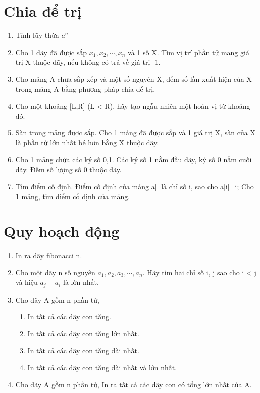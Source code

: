 \documentclass[12pt,a4paper]{article}
\begin{document}
\section{Chia để trị}
\begin{enumerate}
	\item Tính lũy thừa $a^n$
	\item Cho 1 dãy đã được sắp $x_1,x_2,\cdots,x_n$ và 1 số X. Tìm vị trí phần tử mang giá trị X thuộc dãy, nếu không có trả về giá trị -1.
	\item Cho mảng A chưa sắp xếp và một số nguyên X, đếm số lần xuất hiện của X trong mảng A bằng phương pháp chia để trị.
	
	\item Cho một khoảng [L,R] (L < R), hãy tạo ngẫu nhiên một hoán vị từ khoảng đó.
	

	\item Sàn trong mảng được sắp. Cho 1 mảng đã được sắp và 1 giá trị X, sàn của X là phần tử lớn nhất bé hơn bằng X thuộc dãy.
	\item Cho 1 mảng chứa các ký số 0,1. Các ký số 1 nằm đầu dãy, ký số 0 nằm cuối dãy. Đếm số lượng số 0 thuộc dãy.
	\item Tìm điểm cố định. Điểm cố định của mảng a[] là chỉ số i, sao cho a[i]=i; Cho 1 mảng, tìm điểm cố định của mảng.
	
\end{enumerate}

\section{Quy hoạch động}
\begin{enumerate}
	\item In ra dãy fibonacci n.
	\item Cho một dãy n số nguyên $a_1, a_2, a_3,\cdots,a_n$. Hãy tìm hai chỉ số i, j sao cho i < j và hiệu $a_j - a_i$ là lớn nhất.
	\item Cho dãy A gồm n phần tử, 
	\begin{enumerate}
		\item In tất cả các dãy con tăng.
		\item In tất cả các dãy con tăng lớn nhất.
		\item In tất cả các dãy con tăng dài nhất.
		\item In tất cả các dãy con tăng dài nhất và lớn nhất.
	\end{enumerate}
	\item Cho dãy A gồm n phần tử, In ra tất cả các dãy con có tổng lớn nhất của A.
\end{enumerate}
\end{document}
